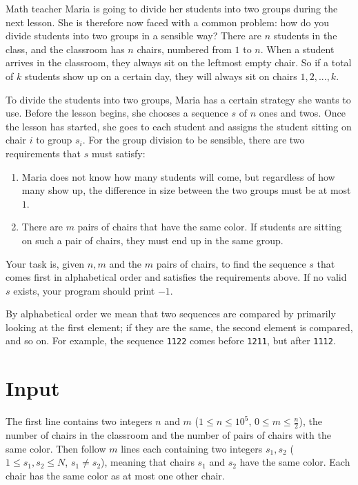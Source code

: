 Math teacher Maria is going to divide her students into two groups during the next lesson.
She is therefore now faced with a common problem: how do you divide students into two groups in a sensible way?
There are $n$ students in the class, and the classroom has $n$ chairs, numbered from $1$ to $n$.
When a student arrives in the classroom, they always sit on the leftmost empty chair.
So if a total of $k$ students show up on a certain day, they will always sit on chairs $1,2,...,k$.

To divide the students into two groups, Maria has a certain strategy she wants to use.
Before the lesson begins, she chooses a sequence $s$ of $n$ ones and twos.
Once the lesson has started, she goes to each student and assigns the student sitting on chair $i$ to group $s_i$.
For the group division to be sensible, there are two requirements that $s$ must satisfy:

\begin{enumerate}
  \item Maria does not know how many students will come, but regardless of how many show up, the difference in size between the two groups must be at most $1$.

  \item There are $m$ pairs of chairs that have the same color. If students are sitting on such a pair of chairs, they must end up in the same group.
\end{enumerate}

Your task is, given $n,m$ and the $m$ pairs of chairs, to find the sequence $s$ that comes first in alphabetical order and satisfies the requirements above.
If no valid $s$ exists, your program should print $-1$.

By alphabetical order we mean that two sequences are compared by primarily looking at the first element; if they are the same, the second element is compared, and so on.
For example, the sequence \texttt{1122} comes before \texttt{1211}, but after \texttt{1112}.

\section*{Input}
The first line contains two integers $n$ and $m$ ($1\leq n \leq 10^5$, $0 \leq m \leq \frac{n}{2}$), the number of chairs in the classroom and the number of pairs of chairs with the same color.
Then follow $m$ lines each containing two integers $s_{1}, s_{2}$ ($1 \leq s_{1}, s_{2} \leq N$, $s_{1} \neq s_{2}$), meaning that chairs $s_{1}$ and $s_{2}$ have the same color.
Each chair has the same color as at most one other chair.

